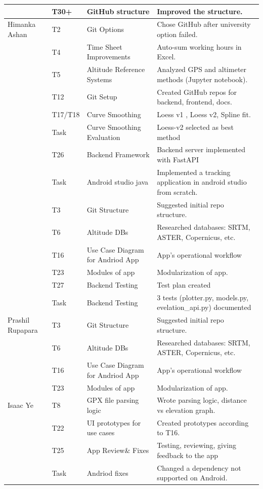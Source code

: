\documentclass[12pt]{article}
\begin{document}
\begin{longtable}{p{3cm} p{1.5cm} p{4cm} p{7cm}}
& T30+ & GitHub structure & Improved the structure. \\
\midrule
Himanka Ashan & T2 & Git Options & Chose GitHub after university option failed. \\
& T4 & Time Sheet Improvements & Auto-sum working hours in Excel. \\
& T5 & Altitude Reference Systems & Analyzed GPS and altimeter methods (Jupyter notebook). \\
& T12 & Git Setup & Created GitHub repos for backend, frontend, docs. \\
& T17/T18 & Curve Smoothing & Loess v1 , Loess v2, Spline fit. \\
& Task & Curve Smoothing Evaluation & Loess-v2 selected as best method \\
& T26 & Backend Framework & Backend server implemented with FastAPI \\
& Task & Android studio java & Implemented a tracking application in android studio from scratch. \\
\midrule
& T3 & Git Structure & Suggested initial repo structure. \\
& T6 & Altitude DBs & Researched databases: SRTM, ASTER, Copernicus, etc. \\
& T16 & Use Case Diagram for Andriod App & App’s operational workflow \\
& T23 & Modules of app & Modularization of app. \\
& T27 & Backend Testing & Test plan created  \\
& Task & Backend Testing & 3 tests (plotter.py, models.py, evelation\_api.py) documented  \\
\midrule
Prashil Rupapara & T3 & Git Structure & Suggested initial repo structure. \\
& T6 & Altitude DBs & Researched databases: SRTM, ASTER, Copernicus, etc. \\
& T16 & Use Case Diagram for Andriod App & App’s operational workflow \\
& T23 & Modules of app & Modularization of app. \\
\midrule
Isaac Ye & T8 & GPX file parsing logic & Wrote parsing logic, distance vs elevation graph. \\
& T22 & UI prototypes for use cases & Created prototypes according to T16. \\
& T25 & App Review\& Fixes & Testing, reviewing, giving feedback to the app \\
& Task & Andriod fixes & Changed a dependency not supported on Android.\\

\end{longtable}
\end{document}
